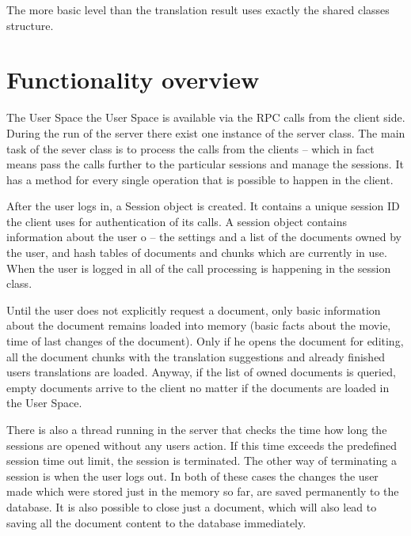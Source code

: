 The more basic level than the translation result uses exactly the shared classes structure.

\section{Functionality overview}

The User Space the User Space is available via the RPC calls from the client side. During the run of the server there exist one instance of the server class. The main task of the sever class is to process the calls from the clients -- which in fact means pass the calls further to the particular sessions and manage the sessions. It has a method for every single operation that is possible to happen in the client.

After the user logs in, a Session object is created. It contains a unique session ID the client uses for authentication of its calls. A session object contains information about the user o -- the settings and a list of the documents owned by the user, and hash tables of documents and chunks which are currently in use. When the user is logged in all of the call processing is happening in the session class.

Until the user does not explicitly request a document, only basic information about the document remains loaded into memory (basic facts about the movie, time of last changes of the document). Only if he opens the document for editing, all the document chunks with the translation suggestions and already finished users translations are loaded. Anyway, if the list of owned documents is queried, empty documents arrive to the client no matter if the documents are loaded in the User Space.

There is also a thread running in the server that checks the time how long the sessions are opened without any users action. If this time exceeds the predefined session time out limit, the session is terminated. The other way of terminating a session is when the user logs out. In both of these cases the changes the user made which were stored just in the memory so far, are saved permanently to the database. It is also possible to close just a document, which will also lead to saving all the document content to the database immediately.

